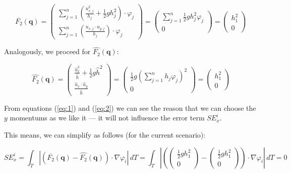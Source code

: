 \documentclass[a4paper, twoside]{article}
\renewcommand{\phi}{\varphi}
\begin{document}
\begin{equation}
  \label{eq:1}
  \overline{F_2}(\mathbf{q}) =
  \begin{pmatrix}
    \sum_{j=1}^n \left( \frac{u_{x,j}^2}{h_j} + \frac{1}{2} g h_j^2 \right) \cdot \phi_j \\
    \sum_{j=1}^n \left( \frac{u_{x,j}\cdot u_{y,j}}{h_j} \right) \cdot \phi_j
  \end{pmatrix} =
  \begin{pmatrix}
    \sum_{j=1}^n \frac{1}{2} g h_j^2 \phi_j \\
    0
  \end{pmatrix} =
  \begin{pmatrix}
    h_1^2 \\ 0
  \end{pmatrix}
\end{equation}

Analogously, we proceed for $\widehat{F_2}(\mathbf{q})$:

\begin{equation}
  \label{eq:2}
  \widehat{F_2}(\mathbf{q}) =
  \begin{pmatrix}
    \frac{\widehat{u}_x^2}{\widehat h} + \frac{1}{2} g \widehat h ^2 \\
    \frac{\widehat u_x \cdot \widehat u_y}{\widehat h}
  \end{pmatrix} =
  \begin{pmatrix}
    \frac{1}{2} g \left( \sum_{j=1}^n h_j \phi_j \right) ^2 \\
    0
  \end{pmatrix} =
  \begin{pmatrix}
    h_1^2 \\ 0
  \end{pmatrix}
\end{equation}

From equations (\ref{eq:1}) and (\ref{eq:2}) we can see the reason that we can choose the $y$ momentums as we like it --- it will not influence the error term $SE_x^i$.

This means, we can simplify as follows (for the current scenario):

\begin{equation*}
  SE_x^i = \int_T \left| \left(\overline{F_2}(\mathbf{q}) - \widehat{F_2}(\mathbf{q})\right) \cdot \nabla \phi_i \right|\, dT = \int_T \left|
    \left(
      \begin{pmatrix}
        \frac{1}{2} g h_1^2 \\ 0
      \end{pmatrix} -
      \begin{pmatrix}
        \frac{1}{2} g h_1^2 \\ 0
      \end{pmatrix}
    \right)
    \cdot \nabla \phi_i \right|\, dT =
  0
\end{equation*}
\end{document}
